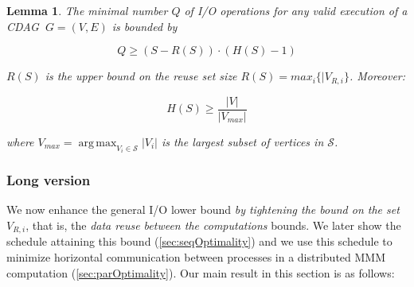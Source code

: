 \documentclass[sigplan,review,anonymous]{acmart}\settopmatter{printfolios=true,printccs=false,printacmref=false}
\newcommand\greg[1]{\textcolor{blue}{[Greg: #1]}}
\DeclareMathOperator*{\argmax}{arg\,max}
\newtheorem{lma}{Lemma}
\newcommand{\macb}[1]{\textbf{\textsf{#1}}}
\begin{document}
\begin{lma}
	\label{lma:reuse}
	The minimal number $Q$ of I/O operations for any valid execution of a CDAG 
	$\ G=(V,E)$ is bounded by  
	
	\vspace{-0.5em}
	\begin{equation}
	Q \ge (S - R(S)) \cdot (H(S) - 1)
	\label{eq:reusebound} \end{equation}
	\vspace{-0.5em}
	
	\noindent
	$R(S)$ is the upper bound on the reuse set size $R(S) = max_i\{|V_{R,i}\}$. 
	Moreover: 
	
	\vspace{-0.5em}
	\begin{equation}\label{eq:reusebound-pmax}
	H(S) \ge \frac{|V|}{|V_{max}|}
	\end{equation}
	\vspace{-0.5em}
	
	\noindent
	where $V_{max} = \argmax_{V_i \in \mathcal{S}}|V_i|$ is 
	the largest
	subset of vertices in $\mathcal{S}$.
	
\end{lma}

\subsubsection{Long version}

%

We now enhance the general I/O lower bound \emph{by tightening the bound on the
	set $V_{R,i}$}, that is, the \emph{data reuse between the computations}
%
bounds. We later show the schedule attaining this bound
(\cref{sec:seqOptimality}) and we use this schedule to minimize horizontal
communication between processes in a distributed MMM computation
(\cref{sec:parOptimality}). 
%
%
%
%
%
Our main result in this section is as follows:
\end{document}

